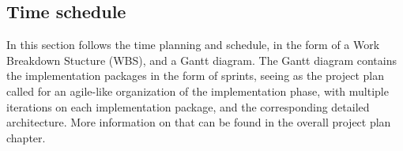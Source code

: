 \subsection{Time schedule}
In this section follows the time planning and schedule, in the form of a Work Breakdown Stucture (WBS), and a Gantt diagram.
The Gantt diagram contains the implementation packages in the form of sprints, seeing as the project plan called for an agile-like organization of the implementation phase, with multiple iterations on each implementation package, and the corresponding detailed architecture. More information on that can be found in the overall project plan chapter.
 